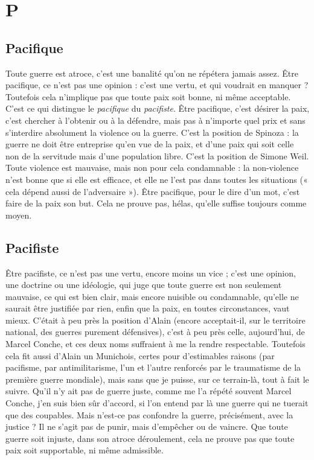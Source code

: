 \chapter{P}
\section{Pacifique}
Toute guerre est atroce, c’est une banalité qu’on ne répétera
jamais assez. Être pacifique, ce n’est pas une opinion : c’est une
vertu, et qui voudrait en manquer ? Toutefois cela n’implique pas que toute
paix soit bonne, ni même acceptable. C’est ce qui distingue le {\it pacifique} du {\it pacifiste}.
Être pacifique, c’est désirer la paix, c’est chercher à l'obtenir ou à la
défendre, mais pas à n’importe quel prix et sans s’interdire absolument la violence
ou la guerre. C’est la position de Spinoza : la guerre ne doit être entreprise
qu’en vue de la paix, et d’une paix qui soit celle non de la servitude mais
d’une population libre. C’est la position de Simone Weil. Toute violence est
mauvaise, mais non pour cela condamnable : la non-violence n’est bonne que
si elle est efficace, et elle ne l’est pas dans toutes les situations (« cela dépend
aussi de l’adversaire »). Être pacifique, pour le dire d’un mot, c’est faire de la
paix son but. Cela ne prouve pas, hélas, qu’elle suffise toujours comme moyen.

\section{Pacifiste}
Être pacifiste, ce n’est pas une vertu, encore moins un vice ; c’est
une opinion, une doctrine ou une idéologie, qui juge que toute
guerre est non seulement mauvaise, ce qui est bien clair, mais encore nuisible
ou condamnable, qu’elle ne saurait être justifiée par rien, enfin que la paix, en
toutes circonstances, vaut mieux. C’était à peu près la position d’Alain (encore
acceptait-il, sur le territoire national, des guerres purement défensives), c’est à
peu près celle, aujourd’hui, de Marcel Conche, et ces deux noms suffraient à
me la rendre respectable. Toutefois cela fit aussi d’Alain un Munichois, certes
pour d’estimables raisons (par pacifisme, par antimilitarisme, l’un et l’autre
renforcés par le traumatisme de la première guerre mondiale), mais sans que je
puisse, sur ce terrain-là, tout à fait le suivre. Qu'il n’y ait pas de guerre juste,
comme me l’a répété souvent Marcel Conche, j’en suis bien sûr d’accord, si
l’on entend par là une guerre qui ne tuerait que des coupables. Mais n’est-ce
pas confondre la guerre, précisément, avec la justice ? Il ne s’agit pas de punir,
mais d'empêcher ou de vaincre. Que toute guerre soit injuste, dans son atroce
déroulement, cela ne prouve pas que toute paix soit supportable, ni même
admissible.

